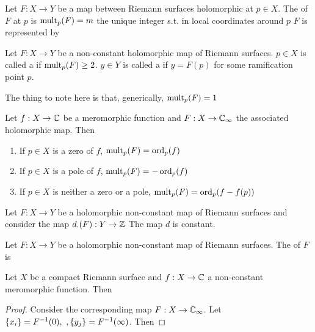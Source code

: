 \documentclass{article}
\begin{document}
\begin{definition}
	Let $F:X \to Y$ be a map between Riemann surfaces holomorphic at $p \in X$. The  of $F$ at $p$ is $\operatorname{mult}_p(F)=m$ the unique integer s.t. in local coordinates around $p$ $F$ is represented by 
\end{definition}

\begin{definition}
Let $F:X \to Y$ be a non-constant holomorphic map of Riemann surfaces. $p \in X$ is called a  if $\operatorname{mult}_p(F) \geq 2$. $y\in Y$ is called a  if $y=F(p)$ for some ramification point $p$. 
\end{definition}

\begin{remark}
	The thing to note here is that, generically, $\operatorname{mult}_p(F) = 1$ 
\end{remark}

\begin{prop}
	Let $f:X \to \mathbb{C}$ be a meromorphic function and $F:X \to \mathbb{C}_\infty$ the associated holomorphic map. Then 
	\begin{enumerate}
		\item If $p \in X$ is a zero of $f$, $\operatorname{mult}_p(F) = \operatorname{ord}_p(f)$
		\item If $p \in X$ is a pole of $f$, $\operatorname{mult}_p(F) = -\operatorname{ord}_p(f)$
		\item If $p \in X$ is neither a zero or a pole, $\operatorname{mult}_p(F) = \operatorname{ord}_p(f-f(p))$
	\end{enumerate}
\end{prop}

\begin{prop}
	Let $F:X \to Y$ be a holomorphic non-constant map of Riemann surfaces and consider the map $d_{\cdot}(F):Y \to \mathbb{Z}$ 
The map $d$ is constant. 
\end{prop}

\begin{definition}
Let $F:X \to Y$ be a holomorphic non-constant map of Riemann surfaces. The  of $F$ is 
\end{definition}

\begin{prop}
	Let $X$ be a compact Riemann surface and $f:X \to \mathbb{C}$ a non-constant meromorphic function. Then 
\end{prop}
\begin{proof}
	Consider the corresponding map $F: X \to \mathbb{C}_\infty$. Let $\left\{ x_i \right\} = F^{-1}(0), \ ,\left\{ y_j \right\} = F^{-1}(\infty)$. Then 
\end{proof}
\end{document}
